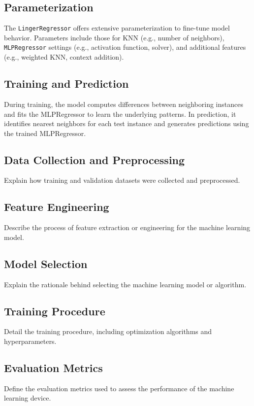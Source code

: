 \documentclass[a4paper, 12pt]{report}
\begin{document}
\subsection{Parameterization}

The \texttt{LingerRegressor} offers extensive parameterization to fine-tune model behavior. Parameters include those for KNN (e.g., number of neighbors), \texttt{MLPRegressor}
 settings (e.g., activation function, solver), and additional features (e.g., weighted KNN, context addition).

\subsection{Training and Prediction}

During training, the model computes differences between neighboring instances and fits the MLPRegressor to learn the underlying patterns. In prediction, it identifies nearest neighbors for each test instance and generates predictions using the trained MLPRegressor.


\subsection{Data Collection and Preprocessing}
Explain how training and validation datasets were collected and preprocessed.

\subsection{Feature Engineering}
Describe the process of feature extraction or engineering for the machine learning model.

\subsection{Model Selection}
Explain the rationale behind selecting the machine learning model or algorithm.

\subsection{Training Procedure}
Detail the training procedure, including optimization algorithms and hyperparameters.

\subsection{Evaluation Metrics}
Define the evaluation metrics used to assess the performance of the machine learning device.
\end{document}
